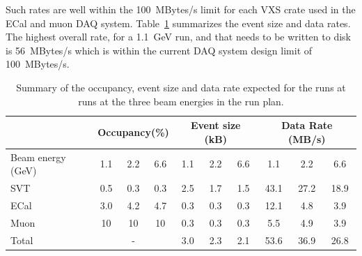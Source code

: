  Such rates are well within the 100~MBytes/s limit for each VXS crate used in the ECal and muon 
DAQ system.
Table~\ref{tab:data_rates} summarizes the event size and data rates. The highest overall rate, for a 1.1~GeV run, and that needs to be written to disk is 56~MBytes/s which is within the current 
DAQ system design limit of 100~MBytes/s. 
\begin{table}[]
\centering
\begin{tabular}{|l|ccc|ccc|ccc|}
\hline
 & \multicolumn{3}{|c|}{Occupancy(\%)} &  \multicolumn{3}{|c|}{Event size (kB)} &  \multicolumn{3}{|c|}{Data Rate (MB/s)} \\
\hline
Beam energy (GeV) & 1.1 & 2.2 & 6.6 & 1.1 & 2.2 & 6.6 & 1.1 & 2.2 & 6.6 \\
\hline
SVT & 0.5 & 0.3  & 0.3  & 2.5 & 1.7 & 1.5 & 43.1 & 27.2 & 18.9\\
ECal & 3.0 & 4.2  & 4.7 & 0.3 & 0.3  & 0.3 & 12.1 & 4.8  & 3.9 \\
Muon & 10 &  10 & 10  & 0.3 & 0.3 & 0.3 & 5.5 & 4.9 & 3.9 \\
\hline
Total& \multicolumn{3}{|c|}{-} & 3.0 & 2.3 & 2.1 & 53.6 & 36.9 & 26.8 \\
\hline
\end{tabular}
\caption{{\small Summary of the occupancy, event size and data rate expected for the runs at  runs at the three beam 
energies in the run plan. }}
\label{tab:data_rates}
\end{table}
